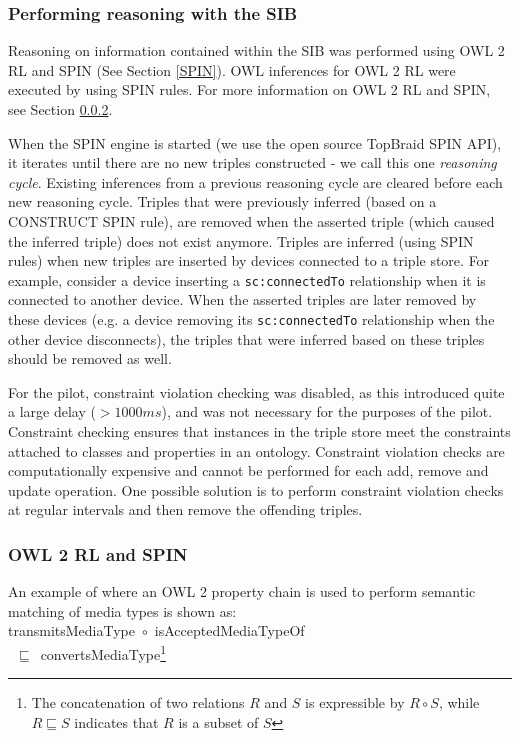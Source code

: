\subsubsection{Performing reasoning with the SIB}

Reasoning on information contained within the SIB was performed using OWL 2 RL and SPIN (See Section \ref{SPIN}).  OWL inferences for OWL 2 RL were executed by using SPIN rules. For more information on OWL 2 RL and SPIN, see Section \ref{owl2rl}.

When the SPIN engine is started (we use the open source TopBraid SPIN API), it iterates until there are no new triples constructed - we call this one \emph{reasoning cycle}. Existing inferences from a previous reasoning cycle are cleared before each new reasoning cycle. Triples that were previously inferred (based on a CONSTRUCT SPIN rule), are removed when the asserted triple (which caused the inferred triple) does not exist anymore. Triples are inferred (using SPIN rules) when new triples are inserted by devices connected to a triple store. For example, consider a device inserting a \texttt{sc:connectedTo} relationship when it is connected to another device. When the asserted triples are later removed by these devices (e.g. a device removing its \texttt{sc:connectedTo} relationship when the other device disconnects), the triples that were inferred based on these triples should be removed as well.

For the pilot, constraint violation checking was disabled, as this introduced quite a large delay ($>1000ms$), and was not necessary for the purposes of the pilot. Constraint checking ensures that instances in the triple store meet the constraints attached to classes and properties in an ontology. Constraint violation checks are computationally expensive and cannot be performed for each add, remove and update operation. One possible solution is to perform constraint violation checks at regular intervals and then remove the offending triples.

\subsubsection{OWL 2 RL and SPIN}
\label{owl2rl}

An example of where an OWL 2 property chain is used to perform semantic matching of media types is shown as:\\


\noindent
transmitsMediaType~\ensuremath{\circ}~isAcceptedMediaTypeOf\\~\ensuremath{\sqsubseteq}~convertsMediaType\footnote{The concatenation of two relations $R$ and $S$ is expressible by $R \circ S $, while $ R \sqsubseteq S$ indicates that $R$ is a subset of $S$ }\\


